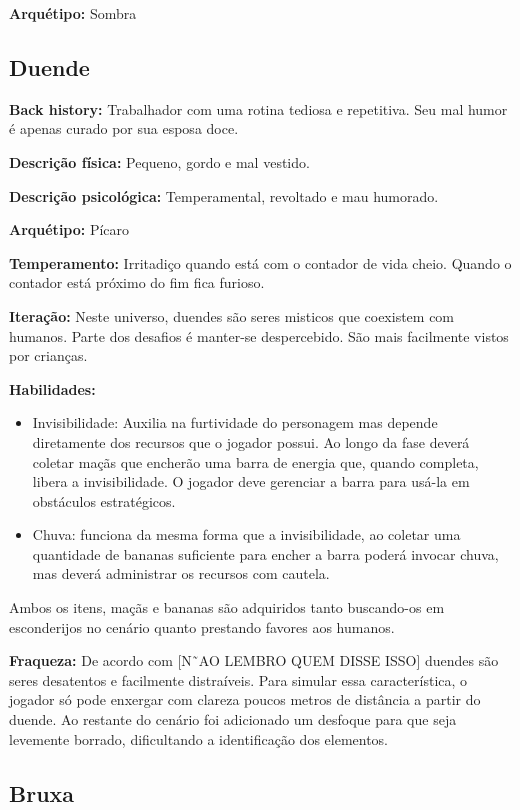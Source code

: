 \textbf{Arquétipo:} Sombra

\subsection{Duende}
\textbf{Back history:} Trabalhador com uma rotina tediosa e repetitiva. Seu mal humor é apenas curado por sua esposa doce.

\textbf{Descrição física:} Pequeno, gordo e mal vestido.

\textbf{Descrição psicológica:} Temperamental, revoltado e mau humorado.

\textbf{Arquétipo:} Pícaro

\textbf{Temperamento:} Irritadiço quando está com o contador de vida cheio. Quando o contador está próximo do fim fica furioso.

\textbf{Iteração: } Neste universo, duendes são seres misticos que coexistem com humanos. Parte dos desafios é manter-se despercebido. São mais facilmente vistos por crianças.

\textbf{Habilidades: }
\begin{itemize}
\item  Invisibilidade: Auxilia na furtividade do personagem mas depende diretamente dos recursos que o jogador possui. Ao longo da fase deverá coletar maçãs que encherão uma barra de energia que, quando completa, libera a invisibilidade. O jogador deve gerenciar a barra para usá-la em obstáculos estratégicos.
\end{itemize}


\begin{itemize}
\item Chuva:  funciona da mesma forma que a invisibilidade, ao coletar uma quantidade de bananas suficiente para encher a barra poderá invocar chuva, mas deverá administrar os recursos com cautela.
\end{itemize}
Ambos os itens, maçãs e bananas são adquiridos tanto buscando-os em esconderijos no cenário quanto prestando favores aos humanos.

\textbf{Fraqueza:} De acordo com [N˜AO LEMBRO QUEM DISSE ISSO] duendes são seres desatentos e facilmente distraíveis. Para simular essa característica, o jogador só pode enxergar com clareza poucos metros de distância a partir do duende. Ao restante do cenário foi adicionado um desfoque para que seja levemente borrado, dificultando a identificação dos elementos.

\subsection{Bruxa}




